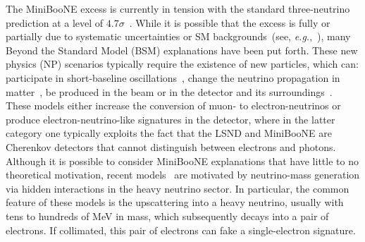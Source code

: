 \graphicspath{{}{miniboone/figs/}{miniboone/}{Diagrams/}}

The MiniBooNE excess is currently in tension with the standard three-neutrino prediction at a level of $4.7 \sigma$~\cite{Aguilar-Arevalo:2018gpe}. While it is possible that the excess is fully or partially due to systematic uncertainties or SM backgrounds~(see, \textit{e.g.},~\cite{AguilarArevalo:2008rc,Aguilar-Arevalo:2012fmn,Hill:2010zy}), many Beyond the Standard Model (BSM) explanations have been put forth. These new physics (NP) scenarios typically require the existence of new particles, which can: participate in short-baseline oscillations~\cite{Murayama:2000hm,Strumia:2002fw,  Barenboim:2002ah, GonzalezGarcia:2003jq, Barger:2003xm,Sorel:2003hf, Barenboim:2004wu, Zurek:2004vd, Kaplan:2004dq, Pas:2005rb, deGouvea:2006qd,Schwetz:2007cd, Farzan:2008zv, Hollenberg:2009ws,Nelson:2010hz, Akhmedov:2010vy, Diaz:2010ft, Bai:2015ztj, Giunti:2015mwa, Liao:2016reh, Papoulias:2016edm, Moss:2017pur, Carena:2017qhd}, change the neutrino propagation in matter~\cite{Liao:2016reh, Liao:2018mbg,Asaadi:2017bhx,Doring:2018cob}, be produced in the beam or in the detector and its surroundings~\cite{Gninenko:2009ks,Gninenko:2010pr,Dib:2011jh,McKeen:2010rx,Masip:2012ke, Masip:2011qb,Gninenko:2012rw,Magill:2018jla}. These models either increase the conversion of muon- to electron-neutrinos or produce electron-neutrino-like signatures in the detector, where in the latter category one typically exploits the fact that the LSND and MiniBooNE are Cherenkov detectors that cannot distinguish between electrons and photons. Although it is possible to consider MiniBooNE explanations that have little to no theoretical motivation, recent models~\cite{Bertuzzo:2018itn,Bertuzzo:2018ftf,Ballett:2018ynz} are motivated by neutrino-mass generation via hidden interactions in the heavy neutrino sector. In particular, the common feature of these models is the upscattering into a heavy neutrino, usually with tens to hundreds of MeV in mass, which subsequently decays into a pair of electrons. If collimated, this pair of electrons can fake a single-electron signature.

